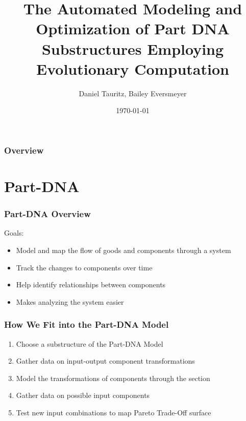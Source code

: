 \documentclass{beamer}
\title[Evolving Part-DNA Substructures]{The Automated Modeling and Optimization of Part DNA Substructures Employing Evolutionary Computation} %
\author{Daniel Tauritz, Bailey Eversmeyer} %
\institute[MST] %
{
Missouri University of Science and Technology \\ %
\medskip
\textit{tauritzd@mst.edu, rbe62d@mst.edu} %
}
\date{\today} %
\begin{document}
\begin{frame}
\titlepage %
\end{frame}

\begin{frame}
\frametitle{Overview} %
\tableofcontents %
\end{frame}

\section{Part-DNA}

\begin{frame}
\frametitle{Part-DNA Overview}
Goals:
\begin{itemize}
\item Model and map the flow of goods and components through a system
\item Track the changes to components over time
\item Help identify relationships between components
\item Makes analyzing the system easier
\end{itemize}
\end{frame}

\begin{frame}
\frametitle{How We Fit into the Part-DNA Model}
\begin{enumerate}
\item Choose a substructure of the Part-DNA Model\pause
\item Gather data on input-output component transformations\pause
\item Model the transformations of components through the section\pause
\item Gather data on possible input components\pause
\item Test new input combinations to map Pareto Trade-Off surface
\end{enumerate}
\end{frame}
\end{document}
